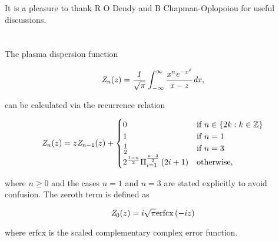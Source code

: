 \documentclass[12pt]{iopart}
\begin{document}
It is a pleasure to thank R O Dendy and B Chapman-Oplopoiou for useful discussions.

\appendix

\section{}

The plasma dispersion function\cite{Fried1961}

\begin{equation}
\it{Z}_n(z)=\frac{1}{\sqrt{\pi}}\int_{-\infty}^{\infty}\frac{x^n e^{-x^2}}{x-z}dx,
\end{equation}

\noindent can be calculated via the recurrence relation\cite{Sampoorna2007}

\begin{equation}
{\it Z}_n(z) = z {\it Z}_{n-1}(z) + \begin{cases}
0 & \text{if } n \in \{2k : k \in \mathbb{Z}\}
\\
1 & \text{if } n = 1
\\
\frac{1}{2} & \text{if } n = 3
\\
2^{\frac{1-n}{2}} \Pi_{i=1}^{\frac{n-3}{2}} \left( 2i + 1 \right) & \text{otherwise},
\end{cases}
\end{equation}

\noindent where $n \geq 0$ and the cases $n=1$ and $n=3$ are stated explicitly to avoid confusion. The zeroth term is defined as

\begin{equation}
 {\it Z}_0(z) = i \sqrt{\pi} \mathrm{erfcx} \left(-i z \right)
\end{equation}

\noindent where $\mathrm{erfcx}$ is the scaled complementary complex error function.

\newpage



\end{document}
